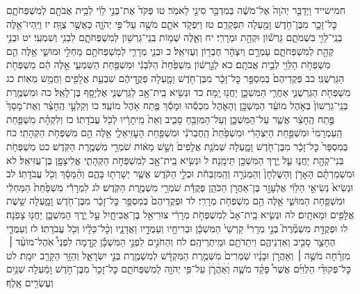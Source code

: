 \documentclass[twoside, openany, parskip=half, 11pt]{book}
\begin{document}
חמישייד וַיְדַבֵּ֤ר יְהֹוָה֙ אֶל־מֹשֶׁ֔ה בְּמִדְבַּ֥ר סִינַ֖י לֵאמֹֽר׃ טו פְּקֹד֙ אֶת־בְּנֵ֣י לֵוִ֔י לְבֵ֥ית אֲבֹתָ֖ם לְמִשְׁפְּחֹתָ֑ם כׇּל־זָכָ֛ר מִבֶּן־חֹ֥דֶשׁ וָמַ֖עְלָה תִּפְקְדֵֽם׃ טז וַיִּפְקֹ֥ד אֹתָ֛ם מֹשֶׁ֖ה עַל־פִּ֣י יְהֹוָ֑ה כַּאֲשֶׁ֖ר צֻוָּֽה׃ יז וַיִּֽהְיוּ־אֵ֥לֶּה בְנֵֽי־לֵוִ֖י בִּשְׁמֹתָ֑ם גֵּרְשׁ֕וֹן וּקְהָ֖ת וּמְרָרִֽי׃ יח וְאֵ֛לֶּה שְׁמ֥וֹת בְּֽנֵי־גֵרְשׁ֖וֹן לְמִשְׁפְּחֹתָ֑ם לִבְנִ֖י וְשִׁמְעִֽי׃ יט וּבְנֵ֥י קְהָ֖ת לְמִשְׁפְּחֹתָ֑ם עַמְרָ֣ם וְיִצְהָ֔ר חֶבְר֖וֹן וְעֻזִּיאֵֽל׃ כ וּבְנֵ֧י מְרָרִ֛י לְמִשְׁפְּחֹתָ֖ם מַחְלִ֣י וּמוּשִׁ֑י אֵ֥לֶּה הֵ֛ם מִשְׁפְּחֹ֥ת הַלֵּוִ֖י לְבֵ֥ית אֲבֹתָֽם׃ כא לְגֵ֣רְשׁ֔וֹן מִשְׁפַּ֙חַת֙ הַלִּבְנִ֔י וּמִשְׁפַּ֖חַת הַשִּׁמְעִ֑י אֵ֣לֶּה הֵ֔ם מִשְׁפְּחֹ֖ת הַגֵּרְשֻׁנִּֽי׃ כב פְּקֻדֵיהֶם֙ בְּמִסְפַּ֣ר כׇּל־זָכָ֔ר מִבֶּן־חֹ֖דֶשׁ וָמָ֑עְלָה פְּקֻ֣דֵיהֶ֔ם שִׁבְעַ֥ת אֲלָפִ֖ים וַחֲמֵ֥שׁ מֵאֽוֹת׃ כג מִשְׁפְּחֹ֖ת הַגֵּרְשֻׁנִּ֑י אַחֲרֵ֧י הַמִּשְׁכָּ֛ן יַחֲנ֖וּ יָֽמָּה׃ כד וּנְשִׂ֥יא בֵֽית־אָ֖ב לַגֵּרְשֻׁנִּ֑י אֶלְיָסָ֖ף בֶּן־לָאֵֽל׃ כה וּמִשְׁמֶ֤רֶת בְּנֵֽי־גֵרְשׁוֹן֙ בְּאֹ֣הֶל מוֹעֵ֔ד הַמִּשְׁכָּ֖ן וְהָאֹ֑הֶל מִכְסֵ֕הוּ וּמָסַ֕ךְ פֶּ֖תַח אֹ֥הֶל מוֹעֵֽד׃ כו וְקַלְעֵ֣י הֶֽחָצֵ֗ר וְאֶת־מָסַךְ֙ פֶּ֣תַח הֶֽחָצֵ֔ר אֲשֶׁ֧ר עַל־הַמִּשְׁכָּ֛ן וְעַל־הַמִּזְבֵּ֖חַ סָבִ֑יב וְאֵת֙ מֵֽיתָרָ֔יו לְכֹ֖ל עֲבֹדָתֽוֹ׃
כז וְלִקְהָ֗ת מִשְׁפַּ֤חַת הַֽעַמְרָמִי֙ וּמִשְׁפַּ֣חַת הַיִּצְהָרִ֔י וּמִשְׁפַּ֙חַת֙ הַֽחֶבְרֹנִ֔י וּמִשְׁפַּ֖חַת הָעׇזִּֽיאֵלִ֑י אֵ֥לֶּה הֵ֖ם מִשְׁפְּחֹ֥ת הַקְּהָתִֽי׃ כח בְּמִסְפַּר֙ כׇּל־זָכָ֔ר מִבֶּן־חֹ֖דֶשׁ וָמָ֑עְלָה שְׁמֹנַ֤ת אֲלָפִים֙ וְשֵׁ֣שׁ מֵא֔וֹת שֹׁמְרֵ֖י מִשְׁמֶ֥רֶת הַקֹּֽדֶשׁ׃ כט מִשְׁפְּחֹ֥ת בְּנֵי־קְהָ֖ת יַחֲנ֑וּ עַ֛ל יֶ֥רֶךְ הַמִּשְׁכָּ֖ן תֵּימָֽנָה׃ ל וּנְשִׂ֥יא בֵֽית־אָ֖ב לְמִשְׁפְּחֹ֣ת הַקְּהָתִ֑י אֱלִיצָפָ֖ן בֶּן־עֻזִּיאֵֽל׃ לא וּמִשְׁמַרְתָּ֗ם הָאָרֹ֤ן וְהַשֻּׁלְחָן֙ וְהַמְּנֹרָ֣ה וְהַֽמִּזְבְּחֹ֔ת וּכְלֵ֣י הַקֹּ֔דֶשׁ אֲשֶׁ֥ר יְשָׁרְת֖וּ בָּהֶ֑ם וְהַ֨מָּסָ֔ךְ וְכֹ֖ל עֲבֹדָתֽוֹ׃ לב וּנְשִׂיא֙ נְשִׂיאֵ֣י הַלֵּוִ֔י אֶלְעָזָ֖ר בֶּן־אַהֲרֹ֣ן הַכֹּהֵ֑ן פְּקֻדַּ֕ת שֹׁמְרֵ֖י מִשְׁמֶ֥רֶת הַקֹּֽדֶשׁ׃ לג לִמְרָרִ֕י מִשְׁפַּ֙חַת֙ הַמַּחְלִ֔י וּמִשְׁפַּ֖חַת הַמּוּשִׁ֑י אֵ֥לֶּה הֵ֖ם מִשְׁפְּחֹ֥ת מְרָרִֽי׃ לד וּפְקֻדֵיהֶם֙ בְּמִסְפַּ֣ר כׇּל־זָכָ֔ר מִבֶּן־חֹ֖דֶשׁ וָמָ֑עְלָה שֵׁ֥שֶׁת אֲלָפִ֖ים וּמָאתָֽיִם׃ לה וּנְשִׂ֤יא בֵֽית־אָב֙ לְמִשְׁפְּחֹ֣ת מְרָרִ֔י צוּרִיאֵ֖ל בֶּן־אֲבִיחָ֑יִל עַ֣ל יֶ֧רֶךְ הַמִּשְׁכָּ֛ן יַחֲנ֖וּ צָפֹֽנָה׃ לו וּפְקֻדַּ֣ת מִשְׁמֶ֘רֶת֮ בְּנֵ֣י מְרָרִי֒ קַרְשֵׁי֙ הַמִּשְׁכָּ֔ן וּבְרִיחָ֖יו וְעַמֻּדָ֣יו וַאֲדָנָ֑יו וְכׇ֨ל־כֵּלָ֔יו וְכֹ֖ל עֲבֹדָתֽוֹ׃ לז וְעַמֻּדֵ֧י הֶחָצֵ֛ר סָבִ֖יב וְאַדְנֵיהֶ֑ם וִיתֵדֹתָ֖ם וּמֵֽיתְרֵיהֶֽם׃ לח וְהַחֹנִ֣ים לִפְנֵ֣י הַמִּשְׁכָּ֡ן קֵ֣דְמָה לִפְנֵי֩ אֹֽהֶל־מוֹעֵ֨ד ׀ מִזְרָ֜חָה מֹשֶׁ֣ה ׀ וְאַהֲרֹ֣ן וּבָנָ֗יו שֹֽׁמְרִים֙ מִשְׁמֶ֣רֶת הַמִּקְדָּ֔שׁ לְמִשְׁמֶ֖רֶת בְּנֵ֣י יִשְׂרָאֵ֑ל וְהַזָּ֥ר הַקָּרֵ֖ב יוּמָֽת׃ לט כׇּל־פְּקוּדֵ֨י הַלְוִיִּ֜ם אֲשֶׁר֩ פָּקַ֨ד מֹשֶׁ֧ה וְׄאַׄהֲׄרֹ֛ׄןׄ עַל־פִּ֥י יְהֹוָ֖ה לְמִשְׁפְּחֹתָ֑ם כׇּל־זָכָר֙ מִבֶּן־חֹ֣דֶשׁ וָמַ֔עְלָה שְׁנַ֥יִם וְעֶשְׂרִ֖ים אָֽלֶף׃
\end{document}
